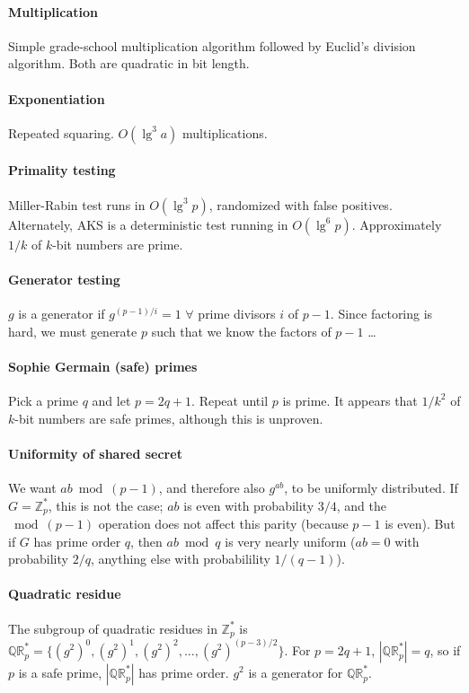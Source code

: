 \documentclass[11pt]{article}
\newcommand{\abs}[1]{{\ensuremath{\left\vert#1\right\vert}}}
\newcommand{\ZZ}{\ensuremath{\mathds{Z}}}
\newcommand{\QR}{\ensuremath{\mathds{QR}}}
\theoremstyle{remark}
\begin{document}
\paragraph{Multiplication}
Simple grade-school multiplication algorithm
followed by Euclid's division algorithm.
Both are quadratic in bit length.

\paragraph{Exponentiation}
Repeated squaring. $O(\lg^3 a)$ multiplications.

\paragraph{Primality testing}
Miller-Rabin test runs in $O(\lg^3p)$, randomized with false positives.
Alternately, AKS is a deterministic test running in $O(\lg^6p)$.
Approximately $1/k$ of $k$-bit numbers are prime.

\paragraph{Generator testing}
$g$ is a generator if $g^{(p-1)/i}=1$ $\forall$
prime divisors $i$ of $p-1$.
Since factoring is hard, we must generate $p$ such that we know
the factors of $p-1$ \ldots

\paragraph{Sophie Germain (safe) primes}
Pick a prime $q$ and let $p=2q+1$. Repeat until $p$ is prime.
It appears that $1/k^2$ of $k$-bit numbers are safe primes,
although this is unproven.

\paragraph{Uniformity of shared secret}
We want $ab\bmod(p-1)$, and therefore also $g^{ab}$,
to be uniformly distributed.
If $G=\ZZ_p^*$, this is not the case;
$ab$ is even with probability $3/4$, and the $\bmod(p-1)$
operation does not affect this parity (because $p-1$ is even).
But if $G$ has prime order $q$, then $ab\bmod q$ is very nearly uniform
($ab=0$ with probability $2/q$, anything else with probabilility $1/(q-1)$).

\paragraph{Quadratic residue}
The subgroup of quadratic residues in $\ZZ_p^*$ is
$\QR_p^* = \{(g^2)^0, (g^2)^1, (g^2)^2, \ldots, (g^2)^{(p-3)/2}\}$.
For $p=2q+1$, $\abs{\QR_p^*}=q$, so if $p$ is a safe prime,
$\abs{\QR_p^*}$ has prime order.
$g^2$ is a generator for $\QR_p^*$.
\end{document}
